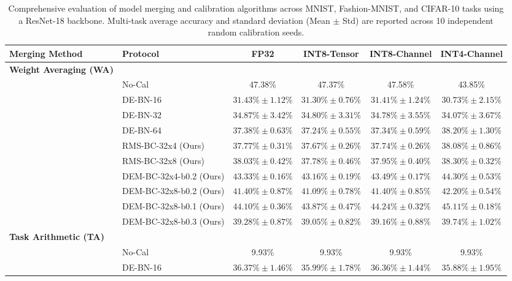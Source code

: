 \documentclass{article}
\begin{document}
\begin{table}[t]
\caption{Comprehensive evaluation of model merging and calibration algorithms across MNIST, Fashion-MNIST, and CIFAR-10 tasks using a ResNet-18 backbone. Multi-task average accuracy and standard deviation (Mean $\pm$ Std) are reported across 10 independent random calibration seeds.}
\label{results-table}
\vskip 0.15in
\begin{center}
\begin{small}
\begin{sc}
\begin{tabular}{llcccc}
\toprule
Merging Method & Protocol & FP32 & INT8-Tensor & INT8-Channel & INT4-Channel \\
\midrule
\textbf{Weight Averaging (WA)} \\
& No-Cal & 47.38\% & 47.37\% & 47.58\% & 43.85\% \\
& DE-BN-16 & $31.43\% \pm 1.12\%$ & $31.30\% \pm 0.76\%$ & $31.41\% \pm 1.24\%$ & $30.73\% \pm 2.15\%$ \\
& DE-BN-32 & $34.87\% \pm 3.42\%$ & $34.80\% \pm 3.31\%$ & $34.78\% \pm 3.55\%$ & $34.07\% \pm 3.67\%$ \\
& DE-BN-64 & $37.38\% \pm 0.63\%$ & $37.24\% \pm 0.55\%$ & $37.34\% \pm 0.59\%$ & $38.20\% \pm 1.30\%$ \\
\cmidrule{2-6}
& RMS-BC-32x4 (Ours) & $37.77\% \pm 0.31\%$ & $37.67\% \pm 0.26\%$ & $37.74\% \pm 0.26\%$ & $38.08\% \pm 0.86\%$ \\
& RMS-BC-32x8 (Ours) & $38.03\% \pm 0.42\%$ & $37.78\% \pm 0.46\%$ & $37.95\% \pm 0.40\%$ & $38.30\% \pm 0.32\%$ \\
& DEM-BC-32x4-b0.2 (Ours) & $43.33\% \pm 0.16\%$ & $43.16\% \pm 0.19\%$ & $43.49\% \pm 0.17\%$ & $44.30\% \pm 0.53\%$ \\
& DEM-BC-32x8-b0.2 (Ours) & $41.40\% \pm 0.87\%$ & $41.09\% \pm 0.78\%$ & $41.40\% \pm 0.85\%$ & $42.20\% \pm 0.54\%$ \\
& DEM-BC-32x8-b0.1 (Ours) & $\mathbf{44.10\% \pm 0.36\%}$ & $\mathbf{43.87\% \pm 0.47\%}$ & $\mathbf{44.24\% \pm 0.32\%}$ & $\mathbf{45.11\% \pm 0.18\%}$ \\
& DEM-BC-32x8-b0.3 (Ours) & $39.28\% \pm 0.87\%$ & $39.05\% \pm 0.82\%$ & $39.16\% \pm 0.88\%$ & $39.74\% \pm 1.02\%$ \\
\midrule
\textbf{Task Arithmetic (TA)} \\
& No-Cal & 9.93\% & 9.93\% & 9.93\% & 9.93\% \\
& DE-BN-16 & $36.37\% \pm 1.46\%$ & $35.99\% \pm 1.78\%$ & $36.36\% \pm 1.44\%$ & $35.88\% \pm 1.95\%$ \\

\end{tabular}
\end{sc}
\end{small}
\end{center}
\end{table}
\end{document}
